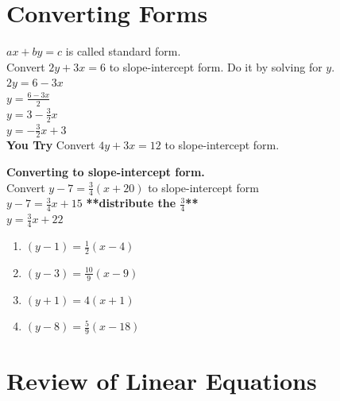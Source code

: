 \documentclass[12pt]{article}
\begin{document}
\pagebreak

\section*{Converting Forms}

\noindent $ax+by=c$ is called standard form.\\ 

\noindent Convert  $2y+3x=6$ to slope-intercept form. Do it by solving for $y$.\\

$2y=6-3x$\\

$y=\frac{6-3x}{2}$\\

$y=3-\frac{3}{2}x$\\

$y=-\frac{3}{2}x+3$\\

\noindent \textbf{You Try} Convert $4y+3x=12$ to slope-intercept form.\\

\vspace{23mm}

\noindent \textbf{Converting to slope-intercept form.} \\

\noindent Convert $y-7=\frac{3}{4}(x+20)$ to slope-intercept form\\

$y-7=\frac{3}{4}x+15$ \textbf{**distribute the $\frac{3}{4}$**}\\

$y=\frac{3}{4}x+22$\\

\begin{enumerate}
\item $(y-1)=\frac{1}{2}(x-4)$\\

\item $(y-3)=\frac{10}{9}(x-9)$\\

\item $(y+1)=4(x+1)$\\

\item $(y-8)=\frac{5}{9}(x-18)$\\

\end{enumerate}

\pagebreak


\section*{Review of Linear Equations}
\end{document}

